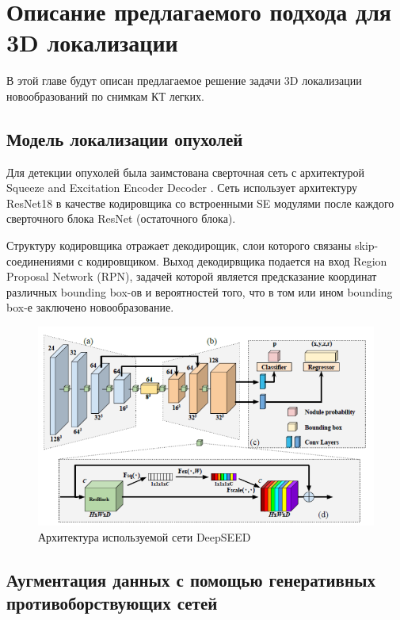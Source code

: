 \chapter{Описание предлагаемого подхода для 3D локализации}

В этой главе будут описан предлагаемое решение задачи 3D локализации новообразований по снимкам КТ легких.

\section{Модель локализации опухолей}

Для детекции опухолей была заимстована сверточная сеть с архитектурой Squeeze and Excitation Encoder Decoder \cite{li2019deepseed}. Сеть использует архитектуру ResNet18 в качестве кодировщика со встроенными SE модулями после каждого сверточного блока ResNet (остаточного блока). 

Структуру кодировщика отражает декодирощик, слои которого связаны skip-соединениями с кодировщиком. Выход декодирвщика подается на вход Region Proposal Network (RPN), задачей которой является предсказание координат различных bounding box-ов и вероятностей того, что в том или ином bounding box-е заключено новообразование.

\begin{figure}[!h]
\includegraphics[width=\linewidth]{images/deep-seed-architecture.png}
\caption{Архитектура используемой сети DeepSEED}\label{deep-seed-architecture}
\centering
\end{figure}


\section{Аугментация данных с помощью генеративных противоборствующих сетей}


